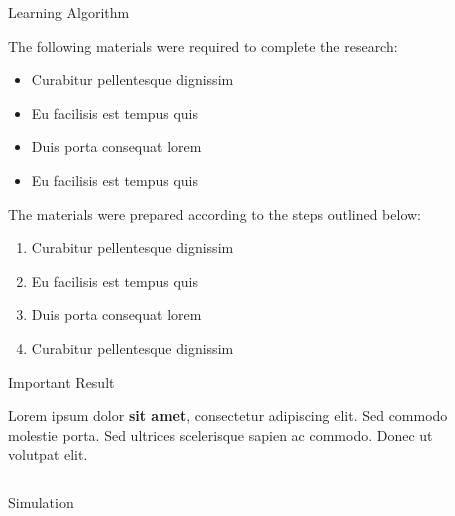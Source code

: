 \documentclass[final]{beamer}
\newlength{\sepwid}
\newlength{\onecolwid}
\newlength{\twocolwid}
\begin{document}
\begin{frame}[t]
\begin{columns}[t]
\begin{column}{\onecolwid}

\end{column}

\begin{column}{\sepwid}\end{column} 

\begin{column}{\twocolwid}

	\begin{block}{Learning Algorithm}

		The following materials were required to complete the research:

		\begin{itemize}
		\item Curabitur pellentesque dignissim
		\item Eu facilisis est tempus quis
		\item Duis porta consequat lorem
		\item Eu facilisis est tempus quis
		\end{itemize}

		The materials were prepared according to the steps outlined below:

		\begin{enumerate}
		\item Curabitur pellentesque dignissim
		\item Eu facilisis est tempus quis
		\item Duis porta consequat lorem
		\item Curabitur pellentesque dignissim
		\end{enumerate}

	\end{block}

\begin{alertblock}{Important Result}

Lorem ipsum dolor \textbf{sit amet}, consectetur adipiscing elit. Sed commodo molestie porta. Sed ultrices scelerisque sapien ac commodo. Donec ut volutpat elit.

\end{alertblock} 


\begin{columns}[t,totalwidth=\twocolwid]

\begin{column}{\onecolwid}\begin{block}{Simulation}


\end{block}
\end{column}
\end{columns}
\end{column}
\end{columns}
\end{frame}
\end{document}
